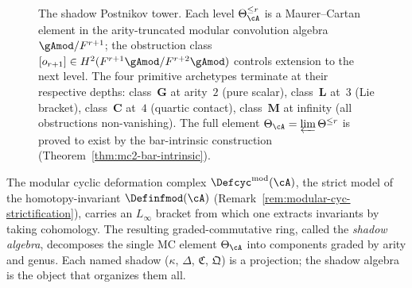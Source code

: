 \begin{figure}[ht]
\caption{The shadow Postnikov tower.
Each level $\Theta_{\cA}^{\leq r}$ is a Maurer--Cartan
element in the arity-truncated modular convolution algebra
$\gAmod/F^{r+1}$; the obstruction class
$[o_{r+1}] \in H^2(F^{r+1}\gAmod/F^{r+2}\gAmod)$
controls extension to the next level.  The four primitive
archetypes terminate at their respective depths: class~$\mathbf{G}$
at arity~$2$ (pure scalar), class~$\mathbf{L}$ at~$3$ (Lie bracket),
class~$\mathbf{C}$ at~$4$ (quartic contact), class~$\mathbf{M}$
at infinity (all obstructions non-vanishing).
The full element $\Theta_{\cA} = \varprojlim\Theta^{\leq r}$
is proved to exist by the bar-intrinsic construction
\textup{(}Theorem~\textup{\ref{thm:mc2-bar-intrinsic})}.}%
\label{fig:shadow-postnikov-tower}
\end{figure}

The modular cyclic deformation complex
$\Defcyc^{\mathrm{mod}}(\cA)$, the strict model of the
homotopy-invariant $\Definfmod(\cA)$
(Remark~\ref{rem:modular-cyc-strictification}), carries an
$L_\infty$ bracket from which one extracts invariants by taking
cohomology.  The resulting graded-commutative ring, called the
\emph{shadow algebra}, decomposes the single MC element
$\Theta_\cA$ into components graded by arity and genus.  Each named
shadow ($\kappa$, $\Delta$, $\mathfrak{C}$, $\mathfrak{Q}$) is a
projection; the shadow algebra is the object that organizes them all.

